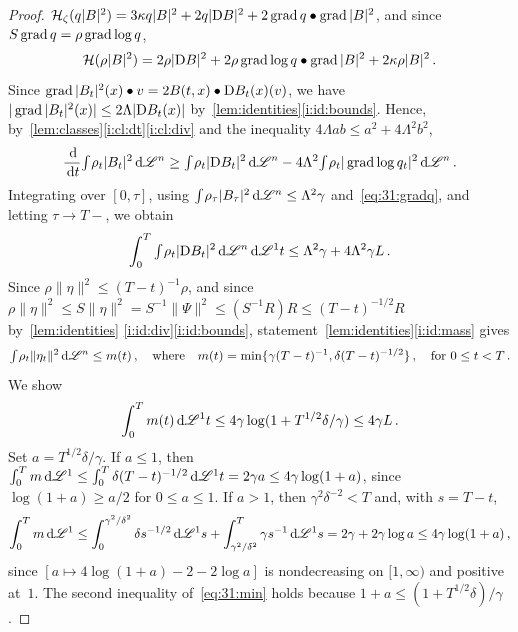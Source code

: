 \documentclass[a4paper,twoside,leqno]{article}
\newcommand{\heatop}{\mathcal{H}}          %
\begin{document}
\begin{proof}
    $\heatop_\zeta(q |B|^2) = 3 \kappa q |B|^2 + 2 q |\uD B|^2 + 2 \grad q \bullet \grad |B|^2$,
    and since $S \operatorname{grad} q = \rho \operatorname{grad} \log q$,
    \begin{displaymath}
        \heatop(\rho |B|^2) = 2 \rho |\uD B|^2 + 2 \rho \grad \log q \bullet \grad |B|^2 + 2 \kappa
        \rho |B|^2 \,.
    \end{displaymath}
    Since $\operatorname{grad} |B_t|^2(x) \bullet v = 2 B(t,x) \bullet \mathrm{D} B_t(x)(v)$, we have $|\operatorname{grad} |B_t|^2(x)|
    \le 2 \Lambda |\mathrm{D} B_t(x)|$ by~\ref{lem:identities}\ref{i:id:bounds}. Hence,
    by~\ref{lem:classes}\ref{i:cl:dt}\ref{i:cl:div} and the inequality $4 \Lambda a b \le a^2 + 4
    \Lambda^2 b^2$,
    \begin{displaymath}
        \frac{\,\mathrm{d}}{\,\mathrm{d} t} {\textstyle\int_{}^{}} \rho_t |B_t|^2 \,\mathrm{d} \mathscr{L}^{n} \ge {\textstyle\int_{}^{}} \rho_t |\mathrm{D}
        B_t|^2 \,\mathrm{d} \mathscr{L}^{n} - 4 \Lambda^2 {\textstyle\int_{}^{}} \rho_t |\operatorname{grad} \log q_t|^2 \,\mathrm{d} \mathscr{L}^{n}
        \,.
    \end{displaymath}
    Integrating over $[0,\tau]$, using ${\textstyle\int_{}^{}} \rho_\tau |B_\tau|^2 \,\mathrm{d} \mathscr{L}^{n} \le
    \Lambda^2 \gamma$ and~\eqref{eq:31:gradq}, and letting $\tau \to T-$, we obtain
    \begin{equation}
        \label{eq:31:DB}
        \int_0^T {\textstyle\int_{}^{}} \rho_t |\mathrm{D} B_t|^2 \,\mathrm{d} \mathscr{L}^{n} \,\mathrm{d} \mathscr{L}^1 t \le \Lambda^2 \gamma +
        4 \Lambda^2 \gamma L \,.
    \end{equation}
    Since $\rho \|\eta\|^2 \le (T-t)^{-1} \rho$, and since $\rho \|\eta\|^2 \le S \|\eta\|^2 =
    S^{-1} \|\Psi\|^2 \le (S^{-1} R) R \le (T-t)^{-1/2} R$ by~\ref{lem:identities}
    \ref{i:id:div}\ref{i:id:bounds}, statement~\ref{lem:identities}\ref{i:id:mass} gives
    \begin{equation}
        \label{eq:31:eta}
        {\textstyle\int_{}^{}} \rho_t \|\eta_t\|^2 \,\mathrm{d} \mathscr{L}^{n} \le m(t) \,, \quad \text{where} \quad m(t)
        = \min \{ \gamma (T-t)^{-1}, \delta (T-t)^{-1/2} \} \,, \quad \text{for $0 \le t < T$} \,.
    \end{equation}
    We show
    \begin{equation}
        \label{eq:31:min}
        \int_0^T m(t) \,\mathrm{d} \mathscr{L}^1 t \le 4 \gamma \log(1 + T^{1/2} \delta / \gamma) \le 4 \gamma L
        \,.
    \end{equation}
    Set $a = T^{1/2} \delta / \gamma$. If $a \le 1$, then $\int_0^T m \,\mathrm{d} \mathscr{L}^1 \le \int_0^T
    \delta (T-t)^{-1/2} \,\mathrm{d} \mathscr{L}^1 t = 2 \gamma a \le 4 \gamma \log(1 + a)$, since $\log(1 + a) \ge
    a/2$ for $0 \le a \le 1$. If $a > 1$, then $\gamma^2 \delta^{-2} < T$ and, with $s = T - t$,
    \begin{displaymath}
        \int_0^T m \,\mathrm{d} \mathscr{L}^1 \le \int_0^{\gamma^2/\delta^2} \delta s^{-1/2} \,\mathrm{d} \mathscr{L}^1 s +
        \int_{\gamma^2/\delta^2}^T \gamma s^{-1} \,\mathrm{d} \mathscr{L}^1 s = 2 \gamma + 2 \gamma \log a \le 4
        \gamma \log(1 + a) \,,
    \end{displaymath}
    since $[a \mapsto 4 \log(1+a) - 2 - 2 \log a]$ is nondecreasing on $[1,\infty)$ and positive
    at~$1$. The second inequality of~\eqref{eq:31:min} holds because $1 + a \le (1 + T^{1/2}
    \delta)/\gamma$.


\end{proof}
\end{document}
